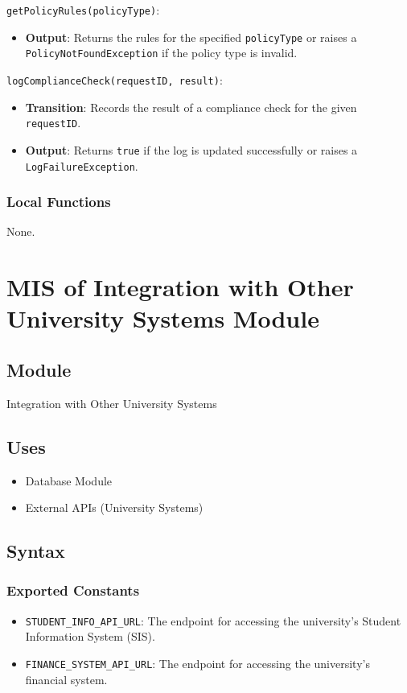 \documentclass[12pt, titlepage]{article}
\begin{document}
\noindent \texttt{getPolicyRules(policyType)}:
\begin{itemize}
    \item \textbf{Output}: Returns the rules for the specified \texttt{policyType} or raises a \texttt{PolicyNotFoundException} if the policy type is invalid.
\end{itemize}

\noindent \texttt{logComplianceCheck(requestID, result)}:
\begin{itemize}
    \item \textbf{Transition}: Records the result of a compliance check for the given \texttt{requestID}.
    \item \textbf{Output}: Returns \texttt{true} if the log is updated successfully or raises a \texttt{LogFailureException}.
\end{itemize}

\subsubsection{Local Functions}
None.

\section{MIS of Integration with Other University Systems Module}

\subsection{Module}
Integration with Other University Systems

\subsection{Uses}
\begin{itemize}
    \item Database Module
    \item External APIs (University Systems)
\end{itemize}

\subsection{Syntax}

\subsubsection{Exported Constants}
\begin{itemize}
    \item \texttt{STUDENT\_INFO\_API\_URL}: The endpoint for accessing the university’s Student Information System (SIS).
    \item \texttt{FINANCE\_SYSTEM\_API\_URL}: The endpoint for accessing the university’s financial system.
\end{itemize}
\end{document}
